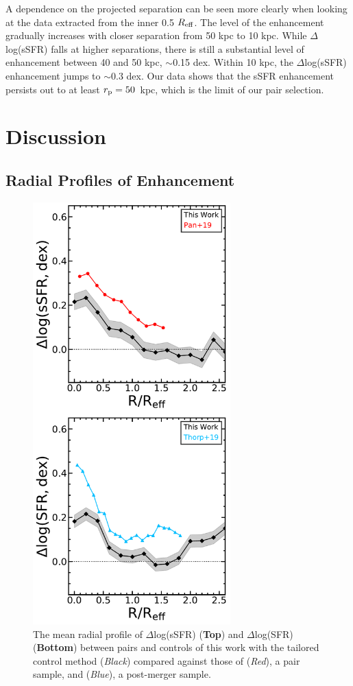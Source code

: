 \documentclass[apj,twocolumn]{emulateapj}
\newcommand{\reff}{$R_{\rm eff}$}
\begin{document}
\begin{CJK*}{UTF8}{gbsn}
A dependence on the projected separation can be seen more clearly when looking at the data extracted from the inner 0.5 \reff. The level of the enhancement gradually increases with closer separation from 50 kpc to 10 kpc. While $\Delta$log(sSFR) falls at higher separations, there is still a substantial level of enhancement between 40 and 50 kpc, $\sim$0.15 dex. Within 10 kpc, the $\Delta$log(sSFR) enhancement jumps to $\sim$0.3 dex. Our data shows that the sSFR enhancement persists out to at least $r_{\rm p} = 50$~kpc, which is the limit of our pair selection. 



\section{Discussion}\label{sec:disc}

\subsection{Radial Profiles of Enhancement}

\begin{figure}
\centering
\includegraphics[width=3in]{prof_comp.pdf}
\caption[]{The mean radial profile of $\Delta$log(sSFR) (\textbf{Top}) and $\Delta$log(SFR) (\textbf{Bottom}) between pairs and controls of this work with the tailored control method ({\it Black}) compared against those of \citet{Pan:2019} ({\it Red}), a pair sample, and \citet{Thorp:2019} ({\it Blue}), a post-merger sample.}
\label{fig:prof_comp}
\end{figure}


\end{CJK*}
\end{document}
